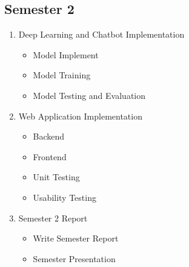 \documentclass[12pt,oneside,openright,a4paper]{cpe-english-project}
\begin{document}
    \subsection{Semester 2}
      \begin{enumerate}
        \item Deep Learning and Chatbot Implementation
          \begin{itemize}
            \item Model Implement
            \item Model Training
            \item Model Testing and Evaluation
          \end{itemize}
        \item Web Application Implementation
          \begin{itemize}
            \item Backend
            \item Frontend
            \item Unit Testing
            \item Usability Testing
          \end{itemize}
        \item Semester 2 Report
          \begin{itemize}
            \item Write Semester Report
            \item Semester Presentation
          \end{itemize}
      \end{enumerate}
\end{document}
